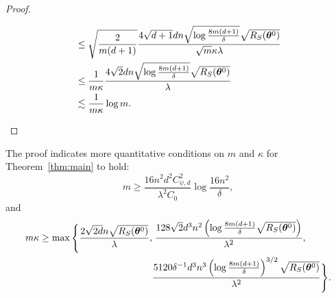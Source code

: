 \documentclass{article}
\begin{document}
\begin{proof}
\begin{enumerate}[(a)]
\begin{equation}
\begin{aligned}
                       & \leq  \sqrt{\frac{2}{m(d+1)}} \frac{4\sqrt{d+1}dn\sqrt{\log\frac{8m(d+1)}{\delta}}\sqrt{R_S(\bm{\theta}^0)}}{\sqrt{m}\kappa\lambda} \\
                       & \leq \frac{1}{m\kappa}\frac{4\sqrt{2}dn\sqrt{\log\frac{8m(d+1)}{\delta}}\sqrt{R_S(\bm{\theta}^0)}}{\lambda}                         \\
                       & \lesssim \frac{1}{m\kappa}\log m.
                  \end{aligned}
              \end{equation}
    \end{enumerate}
\end{proof}
\begin{rmk}
    The proof indicates more quantitative conditions on $m$ and $\kappa$ for Theorem~\ref{thm:main} to hold:
    \begin{equation}
        m\geq \frac{16n^2d^2C_{\psi,d}^2}{\lambda^2C_0}\log\frac{16n^2}{\delta},
    \end{equation}
    and
    \begin{equation}
        \begin{aligned}
            m\kappa\geq\max\Bigg\{\frac{2\sqrt{2d}n\sqrt{R_S(\bm{\theta}^0)}}{\lambda}, & \;\frac{128\sqrt{2}d^3n^2\left(\log\frac{8m(d+1)}{\delta}\sqrt{R_S(\bm{\theta}^0)}\right)}{\lambda^2},                \\
                                                                                    & \frac{5120\delta^{-1}d^3n^3\left(\log\frac{8m(d+1)}{\delta}\right)^{3/2}\sqrt{R_S(\bm{\theta}^0)}}{\lambda^2}\Bigg\}.
        \end{aligned}
    \end{equation}
\end{rmk}
\end{document}

